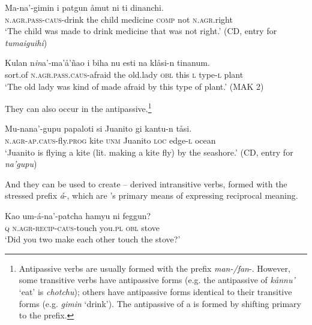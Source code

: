 \documentclass[output=paper,
modfonts
]{LSP/langsci}
\begin{document}
\begin{exe}
\begin{xlist}
\begin{exe}
\ex \label{ex:chung:8}
\begin{xlist}
\ex \label{ex:chung:8a}
\gll Ma-na'-gimin i patgun åmut ni ti dinanchi.\\
\textsc{n.agr.pass}-\textsc{caus-}drink the child medicine \textsc{comp} not \textsc{n.agr.}right\\
\glt `The child was made to drink medicine that was not right.' (CD, entry for \emph{tumaiguihi})

\ex \label{ex:chung:8b} \gll Kulan n\emph{in}a'-ma'å'ñao i biha nu esti na klåsi-n tinanum.\\
sort.of \textsc{n.agr.pass.caus-}afraid the old.lady \textsc{obl} this \textsc{l} type-\textsc{l} plant\\
\glt `The old lady was kind of made afraid by this type of plant.' (MAK 2)
\end{xlist}
\end{exe}

They can also occur in the antipassive.\footnote{Antipassive verbs are
  usually formed with the prefix \emph{man-/fan}-. However, some
  transitive verbs have  antipassive forms (e.g. the
  antipassive of \emph{kånnu'} `eat' is \emph{chotchu}); others have
  antipassive forms identical to their transitive forms (e.g.
  \emph{gimin} `drink'). The antipassive of a  is formed by
  shifting primary  to the  prefix.}

\begin{exe}
\ex \label{ex:chung:9}
\gll Mu-nana'-gupu papaloti si Juanito gi kantu-n tåsi.\\
\textsc{n.agr-ap.caus-}fly.\textsc{prog} kite \textsc{unm} Juanito
\textsc{loc} edge-\textsc{l} ocean\\
\glt `Juanito is flying a kite (lit. making a kite fly) by the seashore.'
(CD, entry for \emph{na'gupu})
\end{exe}

And they can be used to create  -- derived intransitive verbs,
formed with the stressed prefix \emph{á}-, which are 's
primary means of expressing reciprocal meaning.

\begin{exe}
\ex \label{ex:chung:10}
\gll Kao um-á-na'-patcha hamyu ni feggun?\\
\textsc{q} \textsc{n.agr-recip-caus-}touch you.\textsc{pl} \textsc{obl} stove\\
\glt `Did you two make each other touch the stove?'
\end{exe}


\end{xlist}
\end{exe}
\end{document}
